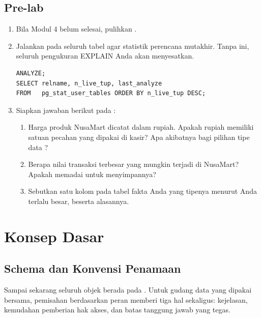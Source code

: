 \subsection{Pre-lab}

\begin{enumerate}[leftmargin=1.4em]
  \item Bila Modul 4 belum selesai, pulihkan .
  \item Jalankan  pada seluruh tabel agar statistik
        perencana mutakhir. Tanpa ini, seluruh pengukuran EXPLAIN Anda akan
        menyesatkan.
\begin{lstlisting}[style=sqlgaya]
ANALYZE;
SELECT relname, n_live_tup, last_analyze
FROM   pg_stat_user_tables ORDER BY n_live_tup DESC;
\end{lstlisting}
  \item Siapkan jawaban berikut pada :
  \begin{enumerate}[label=\alph*.,leftmargin=1.4em]
    \item Harga produk NusaMart dicatat dalam rupiah. Apakah rupiah memiliki
          satuan pecahan yang dipakai di kasir? Apa akibatnya bagi pilihan
          tipe data ?
    \item Berapa nilai transaksi terbesar yang mungkin terjadi di NusaMart?
          Apakah  memadai untuk menyimpannya?
    \item Sebutkan satu kolom pada tabel fakta Anda yang tipenya menurut Anda
          terlalu besar, beserta alasannya.
  \end{enumerate}
\end{enumerate}

\section{Konsep Dasar}

\subsection{Schema dan Konvensi Penamaan}

Sampai sekarang seluruh objek berada pada . Untuk gudang data
yang dipakai bersama, pemisahan berdasarkan peran memberi tiga hal sekaligus:
kejelasan, kemudahan pemberian hak akses, dan batas tanggung jawab yang tegas.

